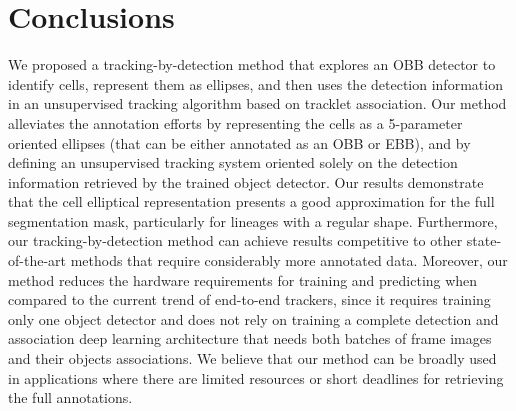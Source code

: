 \documentclass{article}
\begin{document}
\section{Conclusions}

We proposed a tracking-by-detection method that explores an OBB detector to identify cells,  represent them as ellipses, and then uses the detection information in an unsupervised tracking algorithm based on tracklet association. Our method alleviates the annotation efforts by representing the cells as a 5-parameter oriented ellipses (that can be either annotated as an OBB or EBB), and by defining an unsupervised tracking system oriented solely on the detection information retrieved by the trained object detector. Our results demonstrate that the cell elliptical representation presents a good approximation for the full segmentation mask, particularly for lineages with a regular shape. Furthermore, our tracking-by-detection method can achieve results competitive to other state-of-the-art methods that require considerably more annotated data. Moreover, our method reduces the hardware requirements for training and predicting when compared to the current trend of end-to-end trackers, since it requires training only one object detector and does not rely on training a complete detection and association deep learning architecture that needs both batches of frame images and their objects associations. We believe that our method can be broadly used in applications where there are limited resources or short deadlines for retrieving the full annotations.



\end{document}
